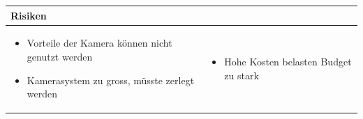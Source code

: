 \begin{table}[h]
\begin{tabular}{p{}p{}}


 \textbf{Risiken} & \\ \hline
	 
\begin{itemize}
\item Vorteile der Kamera können nicht genutzt werden
\item Kamerasystem zu gross, müsste zerlegt werden
\end{itemize}
&
\begin{itemize}
\item Hohe Kosten belasten Budget zu stark
\end{itemize}

 
\end{tabular}
\end{table}

\pagebreak